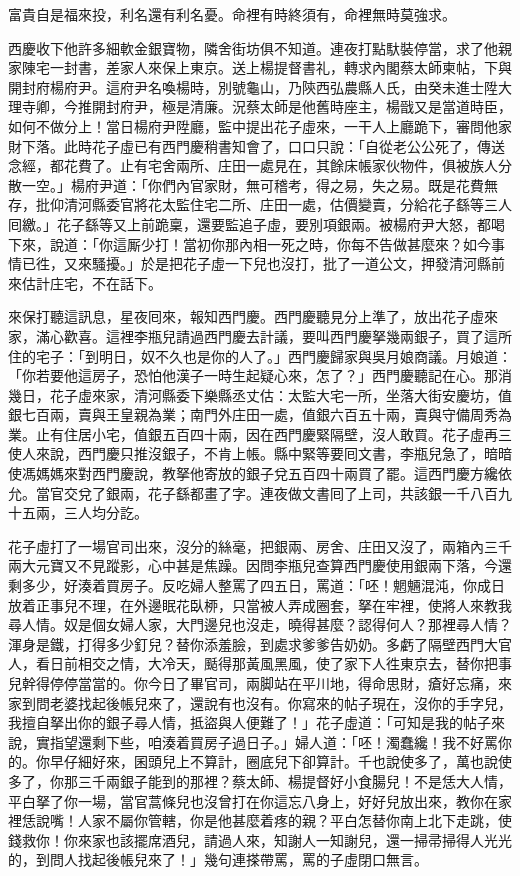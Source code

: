 富貴自是福來投，利名還有利名憂。命裡有時終須有，命裡無時莫強求。

西慶收下他許多細軟金銀寶物，隣舍街坊俱不知道。連夜打點馱裝停當，求了他親家陳宅一封書，差家人來保上東京。送上楊提督書礼，轉求內閣蔡太師柬帖，下與開封府楊府尹。這府尹名喚楊時，別號龜山，乃陝西弘農縣人氏，由癸未進士陞大理寺卿，今推開封府尹，極是清廉。況蔡太師是他舊時座主，楊戩又是當道時臣，如何不做分上！{}當日楊府尹陞廳，監中提出花子虛來，一干人上廳跪下，審問他家財下落。此時花子虛已有西門慶稍書知會了，口口只說：「自從老公公死了，傳送念經，都花費了。止有宅舍兩所、庄田一處見在，其餘床帳家伙物件，俱被族人分散一空。」楊府尹道：「你們內官家財，無可稽考，得之易，失之易。既是花費無存，批仰清河縣委官將花太監住宅二所、庄田一處，估價變賣，分給花子繇等三人囘繳。」花子繇等又上前跪稟，還要監追子虛，要別項銀兩。被楊府尹大怒，都喝下來，說道：「你這厮少打！當初你那內相一死之時，你每不告做甚麼來？如今事情已徃，又來騷擾。」於是把花子虛一下兒也沒打，批了一道公文，押發清河縣前來估計庄宅，不在話下。

來保打聽這訊息，星夜囘來，報知西門慶。西門慶聽見分上準了，放出花子虛來家，滿心歡喜。這裡李瓶兒請過西門慶去計議，要叫西門慶拏幾兩銀子，買了這所住的宅子：「到明日，奴不久也是你的人了。」{}西門慶歸家與吳月娘商議。月娘道：「你若要他這房子，恐怕他漢子一時生起疑心來，怎了？」西門慶聽記在心。那消幾日，花子虛來家，清河縣委下樂縣丞丈估：太監大宅一所，坐落大街安慶坊，值銀七百兩，賣與王皇親為業；南門外庄田一處，值銀六百五十兩，賣與守備周秀為業。止有住居小宅，值銀五百四十兩，因在西門慶緊隔壁，沒人敢買。花子虛再三使人來說，西門慶只推沒銀子，不肯上帳。縣中緊等要囘文書，李瓶兒急了，暗暗使馮媽媽來對西門慶說，教拏他寄放的銀子兌五百四十兩買了罷。這西門慶方纔依允。當官交兌了銀兩，花子繇都畫了字。連夜做文書囘了上司，共該銀一千八百九十五兩，三人均分訖。

花子虛打了一場官司出來，沒分的絲毫，把銀兩、房舍、庄田又沒了，兩箱內三千兩大元寶又不見蹤影，心中甚是焦躁。因問李瓶兒查算西門慶使用銀兩下落，今還剩多少，好湊着買房子。反吃婦人整罵了四五日，罵道：「呸！魍魎混沌，{}你成日放着正事兒不理，在外邊眠花臥桺，只當被人弄成圈套，拏在牢裡，使將人來教我尋人情。奴是個女婦人家，大門邊兒也沒走，曉得甚麼？認得何人？那裡尋人情？渾身是鐵，打得多少釘兒？替你添羞臉，到處求爹爹告奶奶。多虧了隔壁西門大官人，{}看日前相交之情，大冷天，颳得那黃風黑風，使了家下人徃東京去，替你把事兒幹得停停當當的。你今日了畢官司，兩脚站在平川地，得命思財，瘡好忘痛，來家到問老婆找起後帳兒來了，還說有也沒有。你寫來的帖子現在，沒你的手字兒，我擅自拏出你的銀子尋人情，抵盜與人便難了！」{}{}花子虛道：「可知是我的帖子來說，{}實指望還剩下些，咱湊着買房子過日子。」婦人道：「呸！濁蠢纔！我不好罵你的。你早仔細好來，囷頭兒上不算計，圈底兒下卻算計。千也說使多了，萬也說使多了，你那三千兩銀子能到的那裡？蔡太師、楊提督好小食腸兒！不是恁大人情，平白拏了你一場，當官蒿條兒也沒曾打在你這忘八身上，好好兒放出來，教你在家裡恁說嘴！人家不屬你管轄，你是他甚麼着疼的親？平白怎替你南上北下走跳，使錢救你！你來家也該擺席酒兒，請過人來，知謝人一知謝兒，還一掃帚掃得人光光的，到問人找起後帳兒來了！」幾句連搽帶罵，罵的子虛閉口無言。

